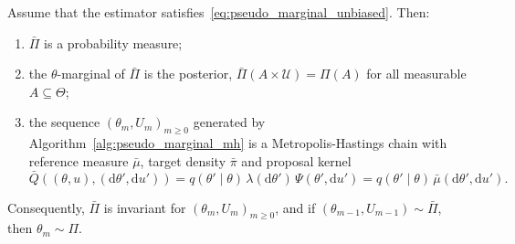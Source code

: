 \begin{theorem}
    \label{thm:pseudo_marginal_exact}
    Assume that the estimator satisfies~\eqref{eq:pseudo_marginal_unbiased}. Then:
    \begin{enumerate}
        \item $\bar{\Pi}$ is a probability measure;
        \item the $\theta$-marginal of $\bar{\Pi}$ is the posterior, $\bar{\Pi}(A\times\mathcal{U}) = \Pi(A)$ for all measurable $A\subseteq\Theta$;
        \item the sequence $(\theta_m,U_m)_{m\ge0}$ generated by Algorithm~\ref{alg:pseudo_marginal_mh} is a Metropolis-Hastings chain with reference measure $\bar{\mu}$, target density $\bar{\pi}$ and proposal kernel
        \begin{equation}
            \bar{Q}\left((\theta,u),(\mathrm{d}\theta',\mathrm{d}u')\right) = q(\theta'\mid\theta)\,\lambda(\mathrm{d}\theta')\,\Psi(\theta',\mathrm{d}u') = q(\theta'\mid\theta)\,\bar{\mu}(\mathrm{d}\theta',\mathrm{d}u').
        \end{equation}
    \end{enumerate}
    Consequently, $\bar{\Pi}$ is invariant for $(\theta_m,U_m)_{m\ge0}$, and if $(\theta_{m-1},U_{m-1})\sim\bar{\Pi}$, then $\theta_m\sim\Pi$.
\end{theorem}
